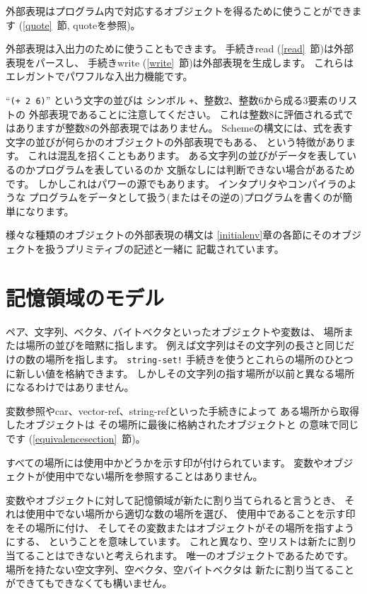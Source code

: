 外部表現はプログラム内で対応するオブジェクトを得るために使うことができます
(\ref{quote}~節, {\cf quote}を参照)。

外部表現は入出力のために使うこともできます。
手続き{\cf read} (\ref{read}~節)は外部表現をパースし、
手続き{\cf write} (\ref{write}~節)は外部表現を生成します。
これらはエレガントでパワフルな入出力機能です。

``{\tt(+ 2 6)}'' という文字の並びは
シンボル {\tt +}、整数2、整数6から成る3要素のリストの
外部表現であることに注意してください。
これは整数8に評価される式ではありますが整数8の外部表現ではありません。
Schemeの構文には、式を表す文字の並びが何らかのオブジェクトの外部表現でもある、
という特徴があります。
これは混乱を招くこともあります。
ある文字列の並びがデータを表しているのかプログラムを表しているのか
文脈なしには判断できない場合があるためです。
しかしこれはパワーの源でもあります。
インタプリタやコンパイラのような
プログラムをデータとして扱う(またはその逆の)プログラムを書くのが簡単になります。

様々な種類のオブジェクトの外部表現の構文は
\ref{initialenv}章の各節にそのオブジェクトを扱うプリミティブの記述と一緒に
記載されています。

\section{記憶領域のモデル}
\label{storagemodel}

ペア、文字列、ベクタ、バイトベクタといったオブジェクトや変数は、
場所または場所の並びを暗黙に指します。
例えば文字列はその文字列の長さと同じだけの数の場所を指します。
{\tt string-set!} 手続きを使うとこれらの場所のひとつに新しい値を格納できます。
しかしその文字列の指す場所が以前と異なる場所になるわけではありません。

変数参照や{\cf car}、{\cf vector-ref}、{\cf string-ref}といった手続きによって
ある場所から取得したオブジェクトは
その場所に最後に格納されたオブジェクトと の意味で同じです
(\ref{equivalencesection}~節)。

すべての場所には使用中かどうかを示す印が付けられています。
変数やオブジェクトが使用中でない場所を参照することはありません。

変数やオブジェクトに対して記憶領域が新たに割り当てられると言うとき、
それは使用中でない場所から適切な数の場所を選び、
使用中であることを示す印をその場所に付け、
そしてその変数またはオブジェクトがその場所を指すようにする、
ということを意味しています。
これと異なり、空リストは新たに割り当てることはできないと考えられます。
唯一のオブジェクトであるためです。
場所を持たない空文字列、空ベクタ、空バイトベクタは
新たに割り当てることができてもできなくても構いません。

